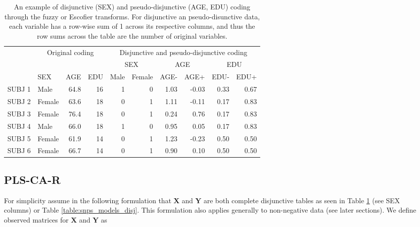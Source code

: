 \documentclass[12pt]{article}
\begin{document}
\begin{table}[!h]

\caption{\label{tab:unnamed-chunk-1}\label{table:disj} An example of disjunctive (SEX) and pseudo-disjunctive (AGE, EDU) coding through the fuzzy or Escofier transforms. For disjunctive an pseudo-disunctive data, each variable has a row-wise sum of 1 across its respective columns, and thus the row sums across the table are the number of original variables.}
\centering
\begin{tabular}[t]{llrrrrrrrr}
\toprule
\multicolumn{1}{c}{ } & \multicolumn{3}{c}{Original coding} & \multicolumn{6}{c}{Disjunctive and pseudo-disjunctive coding} \\
\cmidrule(l{2pt}r{2pt}){2-4} \cmidrule(l{2pt}r{2pt}){5-10}
\multicolumn{4}{c}{ } & \multicolumn{2}{c}{SEX} & \multicolumn{2}{c}{AGE} & \multicolumn{2}{c}{EDU} \\
\cmidrule(l{2pt}r{2pt}){5-6} \cmidrule(l{2pt}r{2pt}){7-8} \cmidrule(l{2pt}r{2pt}){9-10}
  & SEX & AGE & EDU & Male & Female & AGE- & AGE+ & EDU- & EDU+\\
\midrule
SUBJ 1 & Male & 64.8 & 16 & 1 & 0 & 1.03 & -0.03 & 0.33 & 0.67\\
SUBJ 2 & Female & 63.6 & 18 & 0 & 1 & 1.11 & -0.11 & 0.17 & 0.83\\
SUBJ 3 & Female & 76.4 & 18 & 0 & 1 & 0.24 & 0.76 & 0.17 & 0.83\\
SUBJ 4 & Male & 66.0 & 18 & 1 & 0 & 0.95 & 0.05 & 0.17 & 0.83\\
SUBJ 5 & Female & 61.9 & 14 & 0 & 1 & 1.23 & -0.23 & 0.50 & 0.50\\
\addlinespace
SUBJ 6 & Female & 66.7 & 14 & 0 & 1 & 0.90 & 0.10 & 0.50 & 0.50\\
\bottomrule
\end{tabular}
\end{table}

\hypertarget{pls-ca-r}{%
\subsection{PLS-CA-R}\label{pls-ca-r}}

\label{section:plscar_form}

For simplicity assume in the following formulation that \({\mathbf X}\)
and \({\mathbf Y}\) are both complete disjunctive tables as seen in
Table \ref{table:disj} (see SEX columns) or Table
\ref{table:snps_models_disj}. This formulation also applies generally to
non-negative data (see later sections). We define observed matrices for
\({\mathbf X}\) and \({\mathbf Y}\) as
\end{document}
